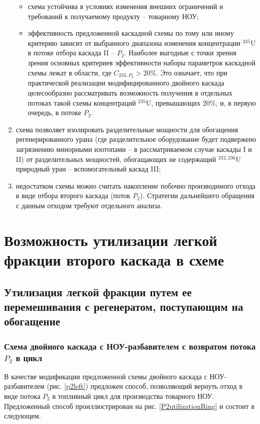 \begin{enumerate}
\begin{itemize}
    \item схема устойчива в условиях изменения внешних ограничений и требований к получаемому продукту -- товарному НОУ;
    \item эффективность предложенной каскадной схемы по тому или иному критерию зависит от выбранного диапазона изменения концентрации $^{235}$U в потоке отбора каскада II -- $P_2$. Наиболее выгодные с точки зрения зрения основных критериев эффективности наборы параметров каскадной схемы лежат в области, где $C_{235,{P_2}} > 20\%$. Это означает, что при практической реализации модифицированного двойного каскада целесообразно рассматривать возможность получения в отдельных потоках такой схемы концентраций $^{235}$U, превышающих 20\%, и, в первую очередь, в потоке $P_2$.
    \end{itemize}       
    \item схема позволяет изолировать разделительные мощности для обогащения регенерированного урана (где разделительное оборудование будет подвержено загрязнению минорными изотопами -- в рассматриваемом случае каскады I и II) от разделительных мощностей, обогащающих не содержащий $^{232,236}$U природный уран -- вспомогательный каскад III;
    \item недостатком схемы можно считать накопление побочно производимого отхода в виде отбора второго каскада (поток $P_2$). Стратегии дальнейшего обращения с данным отходом требуют отдельного анализа.
\end{enumerate}


\section{Возможность утилизации легкой фракции второго каскада в схеме}

\subsection{Утилизация легкой фракции путем ее перемешивания с регенератом, поступающим на обогащение}

\subsubsection{Схема двойного каскада с НОУ-разбавителем с возвратом потока $P_2$ в цикл}\label{P2ret}

В качестве модификации предложенной схемы двойного каскада с НОУ-разбавителем (рис. \ref{p2left}) предложен способ, позволяющий вернуть отход в виде потока $P_2$ в топливный цикл для производства товарного НОУ. Предложенный способ проиллюстрирован на рис. \ref{P2utilizationRing} и состоит в следующем.

